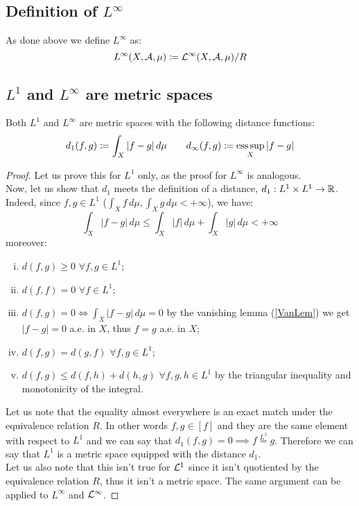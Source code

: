 \subsection{Definition of \texorpdfstring{$L^\infty$}{Linf}}
As done above we define $L^\infty$ as:
\[
    L^\infty(X,\mathcal{A},\mu) \coloneqq \mathcal{L}^\infty(X,\mathcal{A},\mu)/R    
\]

\subsection{\texorpdfstring{$L^1$}{L1} and \texorpdfstring{$L^\infty$}{Linf} are metric spaces}
Both $L^1$ and $L^\infty$ are metric spaces with the following distance functions:
\[
    d_1(f,g) \coloneqq \int_X |f-g| \, d\mu \quad \quad d_\infty(f,g) \coloneqq \operatorname*{ess\,sup}_X |f-g| 
\]

\begin{proof}
    Let us prove this for $L^1$ only, as the proof for $L^\infty$ is analogous. \\
    Now, let us show that $d_1$ meets the definition of a distance, $d_1: L^1\times L^1 \to \mathbb{R}$. Indeed, since $f,g\in L^1$ ($\int_X f \, d\mu, \int_X g \, d\mu < + \infty$), we have:
    \[
        \int_X |f-g| \, d\mu \leq \int_X |f| \, d\mu + \int_X |g| \, d\mu < + \infty
    \]
    moreover:
    \begin{enumerate}[i)]
        \item $d(f,g)\geq 0 $ $\forall f,g \in L^1$;
        \item $d(f,f)=0$ $\forall f \in L^1$;
        \item $d(f,g)=0 \iff \int_X |f-g| \, d\mu =0$ by the vanishing lemma (\ref*{VanLem}) we get $|f-g|=0$ a.e. in $X$, thus $f=g$ a.e. in $X$;
        \item $d(f,g)=d(g,f)$ $\forall f,g \in L^1$;
        \item $d(f,g)\leq d(f,h)+d(h,g)$ $\forall f,g,h \in L^1$ by the triangular inequality and monotonicity of the integral.
    \end{enumerate}
    Let us note that the equality almost everywhere is an exact match under the equivalence relation $R$. In other words $f,g \in [f]$ and they are the same element with respect to $L^1$ and we can say that $d_1(f,g)=0\implies f \overset{L^1}{=}g$. Therefore we can say that $L^1$ is a metric space equipped with the distance $d_1$.\\
    Let us also note that this isn't true for $\mathcal{L}^1$ since it isn't quotiented by the equivalence relation $R$, thus it isn't a metric space. The same argument can be applied to $L^\infty$ and $\mathcal{L}^\infty$.
\end{proof}

